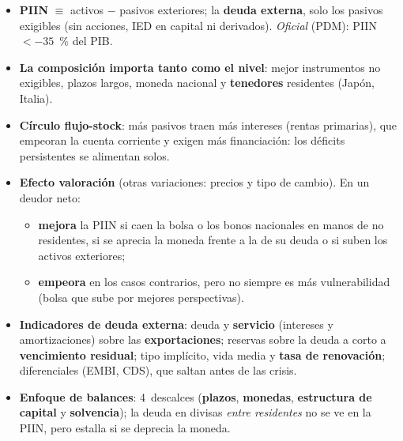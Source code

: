 \documentclass{article}
\begin{document}
\begin{columnas}
\begin{itemize}[itemsep=1.5pt]
\item \textbf{PIIN} $\equiv$ activos $-$ pasivos exteriores; la \textbf{deuda externa}, solo los pasivos exigibles (sin acciones, IED en capital ni derivados). \emph{Oficial} (PDM): PIIN $<-35$~\% del PIB.
\item \textbf{La composición importa tanto como el nivel}: mejor instrumentos no exigibles, plazos largos, moneda nacional y \textbf{tenedores} residentes (Japón, Italia).
\item \textbf{Círculo flujo-stock}: más pasivos traen más intereses (rentas primarias), que empeoran la cuenta corriente y exigen más financiación: los déficits persistentes se alimentan solos.
\item \textbf{Efecto valoración} (otras variaciones: precios y tipo de cambio). En un deudor neto:
  \begin{itemize}
  \item \textbf{mejora} la PIIN si caen la bolsa o los bonos nacionales en manos de no residentes, si se aprecia la moneda frente a la de su deuda o si suben los activos exteriores;
  \item \textbf{empeora} en los casos contrarios, pero no siempre es más vulnerabilidad (bolsa que sube por mejores perspectivas).
  \end{itemize}
\item \textbf{Indicadores de deuda externa}: deuda y \textbf{servicio} (intereses y amortizaciones) sobre las \textbf{exportaciones}; reservas sobre la deuda a corto a \textbf{vencimiento residual}; tipo implícito, vida media y \textbf{tasa de renovación}; diferenciales (EMBI, CDS), que saltan antes de las crisis.
\item \textbf{Enfoque de balances}: 4~descalces (\textbf{plazos}, \textbf{monedas}, \textbf{estructura de capital} y \textbf{solvencia}); la deuda en divisas \emph{entre residentes} no se ve en la PIIN, pero estalla si se deprecia la moneda.
\end{itemize}


\end{columnas}
\end{document}
